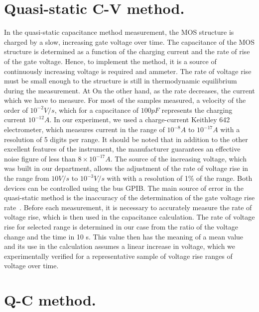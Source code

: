 \section{Quasi-static C-V method.}\label{sec:3.2}

In the quasi-static capacitance method measurement, the MOS structure
is charged by a slow, increasing gate voltage over time. The
capacitance of the MOS structure is determined as a function of the
charging current and the rate of rise of the gate voltage.  Hence, to
implement the method, it is a source of continuously increasing
voltage is required and ammeter. The rate of voltage rise must be
small enough to the structure is still in thermodynamic equilibrium
during the measurement. At On the other hand, as the rate decreases,
the current which we have to measure. For most of the samples
measured, a velocity of the order of $10^{-2}V/s$, which for a
capacitance of $100pF$ represents the charging current $10^{-12}A$. In
our experiment, we used a charge-current Keithley 642 electrometer,
which measures current in the range of $10^{-8}A$ to $10^{-17}A$ with
a resolution of 5 digits per range.  It should be noted that in
addition to the other excellent features of the instrument, the
manufacturer guarantees an effective noise figure of less than
$8\times10^{-17}A$. The source of the increasing voltage, which was
built in our department, allows the adjustment of the rate of voltage
rise in the range from $10V/s$ to $10^{-3}V/s$ with with a resolution
of 1\% of the range. Both devices can be controlled using the bus
GPIB\@.  The main source of error in the quasi-static method is the
inaccuracy of the determination of the gate voltage rise
rate~\cite{1.5}. Before each measurement, it is necessary to
accurately measure the rate of voltage rise, which is then used in the
capacitance calculation. The rate of voltage rise for selected range
is determined in our case from the ratio of the voltage change and the
time in 10 s. This value then has the meaning of a mean value and its
use in the calculation assumes a linear increase in voltage, which we
experimentally verified for a representative sample of voltage rise
ranges of voltage over time.

\section{Q-C method.}\label{sec:3.3}

